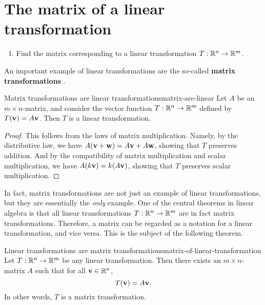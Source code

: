 \section{The matrix of a linear transformation}
\label{sec:matrix-of-transformation}

\begin{outcome}
  \begin{enumerate}
  \item Find the matrix corresponding to a linear transformation
    $T:\mathbb{R}^n\to\mathbb{R}^m$.
  \end{enumerate}
\end{outcome}

An important example of linear transformations are the so-called
\textbf{matrix transformations}%
%
.

\begin{proposition}{Matrix transformations are linear transformations}{matrix-are-linear}
  Let $A$ be an $m\times n$-matrix, and consider the vector function
  $T:\mathbb{R}^{n}\to \mathbb{R}^{m}$ defined by $T(\vect{v}) = A\vect{v}$. Then $T$
  is a linear transformation.
\end{proposition}

\begin{proof}
  This follows from the laws of matrix multiplication. Namely, by the
  distributive law, we have
  $A(\vect{v}+\vect{w}) = A\vect{v} + A\vect{w}$, showing that $T$
  preserves addition. And by the compatibility of matrix multiplication
  and scalar multiplication, we have $A(k\vect{v}) = k(A\vect{v})$,
  showing that $T$ preserves scalar multiplication.
\end{proof}

In fact, matrix transformations are not just an example of linear
transformations, but they are essentially the {\em only} example. One
of the central theorems in linear algebra is that all linear
transformations $T:\mathbb{R}^n\to\mathbb{R}^m$ are in fact matrix transformations.
Therefore, a matrix can be regarded as a notation for a linear
transformation, and vice versa. This is the subject of the following
theorem.

\begin{theorem}{Linear transformations are matrix transformations}{matrix-of-linear-transformation}
  Let $T:\mathbb{R}^n\to\mathbb{R}^m$ be any linear transformation. Then there exists
  an $m\times n$-matrix $A$%
   such that for all
  $\vect{v}\in\R^n$,
  \begin{equation*}
    T(\vect{v}) = A\vect{v}.
  \end{equation*}
  In other words, $T$ is a matrix transformation.
\end{theorem}

